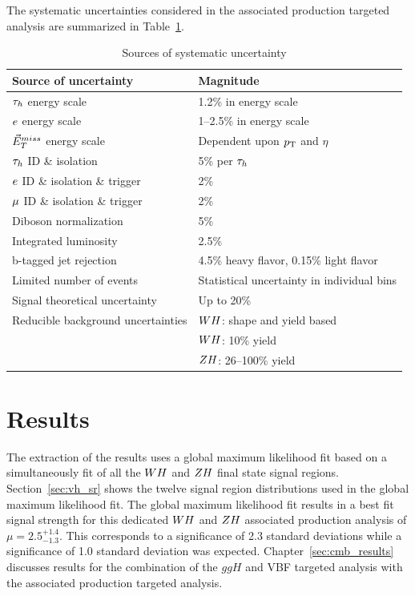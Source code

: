 The systematic uncertainties considered in the associated production
targeted analysis are summarized in Table~\ref{tab:vh_uncertainties}.

\begin{table}[!ht]
\centering
{}
\begin{tabular}{ll}
Source of uncertainty & Magnitude \\
\hline
 $\tau_{h}$ energy scale                & 1.2\% in energy scale\\
 $e$ energy scale               & 1--2.5\%  in energy scale \\
 $\vec{E}^{miss}_T$ energy scale              & Dependent upon $p_\mathrm{T}$ and $\eta$ \\
 $\tau_{h}$ ID \& isolation & 5\% per $\tau_{h}$  \\
 $e$ ID \& isolation \& trigger  &   2\%  \\
 $\mu$ ID \& isolation \& trigger & 2\%  \\
 Diboson normalization & 5\% \\
 Integrated luminosity     & 2.5\%  \\
 b-tagged jet rejection & 4.5\% heavy flavor, 0.15\% light flavor \\
 Limited number of events                & Statistical uncertainty in individual bins  \\
 Signal theoretical uncertainty  & Up to 20\% \\
 Reducible background uncertainties & $WH$: shape and yield based \\
                                    & $WH$: 10\% yield \\
                                    & $ZH$: 26--100\% yield \\
\hline
\end{tabular}
\caption{Sources of systematic uncertainty}
\label{tab:vh_uncertainties}
\end{table}



\section{Results}
\label{sec:vh_results}

The extraction of the results uses a global maximum likelihood fit based on a 
simultaneously fit of all the $WH$ and $ZH$ final state signal regions. 
Section~\ref{sec:vh_sr} shows the twelve signal region distributions
used in the global maximum likelihood fit. 
The global maximum likelihood fit results in a best fit signal
strength for this dedicated $WH$ and $ZH$ associated production analysis of
$\mu = 2.5 ^{+1.4} _{-1.3}$. This corresponds to 
a significance of 2.3 standard deviations while a significance of 1.0 standard deviation was expected.
Chapter~\ref{sec:cmb_results} discusses results for the combination of the
$ggH$ and VBF targeted analysis with the associated production targeted
analysis.

